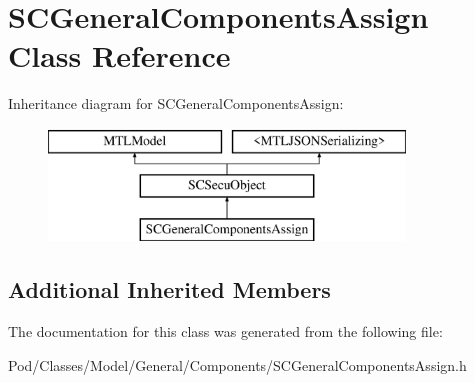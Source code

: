 \hypertarget{interface_s_c_general_components_assign}{}\section{S\+C\+General\+Components\+Assign Class Reference}
\label{interface_s_c_general_components_assign}
Inheritance diagram for S\+C\+General\+Components\+Assign\+:\begin{figure}[H]
\begin{center}
\leavevmode
\includegraphics[height=3.000000cm]{interface_s_c_general_components_assign}
\end{center}
\end{figure}
\subsection*{Additional Inherited Members}


The documentation for this class was generated from the following file\+:\begin{DoxyCompactItemize}
\item 
Pod/\+Classes/\+Model/\+General/\+Components/S\+C\+General\+Components\+Assign.\+h\end{DoxyCompactItemize}
